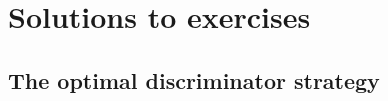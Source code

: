 \section{Solutions to exercises}
\label{sec:solutions}

\subsection{The optimal discriminator strategy}
\label{sec:opt_d_soln}
